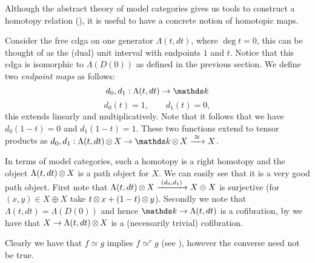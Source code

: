 
Although the abstract theory of model categories gives us tools to construct a homotopy relation (), it is useful to have a concrete notion of homotopic maps.

Consider the free cdga on one generator $\Lambda(t, dt)$, where $\deg{t} = 0$, this can be thought of as the (dual) unit interval with endpoints $1$ and $t$. Notice that this cdga is isomorphic to $\Lambda(D(0))$ as defined in the previous section. We define two \emph{endpoint maps} as follows:
$$ d_0, d_1 : \Lambda(t, dt) \to \k $$
$$ d_0(t) = 1, \qquad d_1(t) = 0, $$
this extends linearly and multiplicatively. Note that it follows that we have $d_0(1-t) = 0$ and $d_1(1-t) = 1$. These two functions extend to tensor products as $d_0, d_1: \Lambda(t, dt) \tensor X \to \k \tensor X \tot{\iso} X$.


In terms of model categories, such a homotopy is a right homotopy and the object $\Lambda(t, dt) \operatorname*{\otimes} X$ is a path object for $X$. We can easily see that it is a very good path object. First note that $\Lambda(t, dt) \operatorname*{\otimes} X \xrightarrow{\,\,{(d_0, d_1)}\,\,} X \oplus X$ is surjective (for $(x, y) \in X \oplus X$ take $t \operatorname*{\otimes} x + (1-t) \operatorname*{\otimes} y$). Secondly we note that $\Lambda(t, dt) = \Lambda(D(0))$ and hence $\k \to \Lambda(t, dt)$ is a cofibration, by  we have that $X \to \Lambda(t, dt) \operatorname*{\otimes} X$ is a (necessarily trivial) cofibration.

Clearly we have that $f \simeq g$ implies $f \simeq^r g$ (see ), however the converse need not be true.



